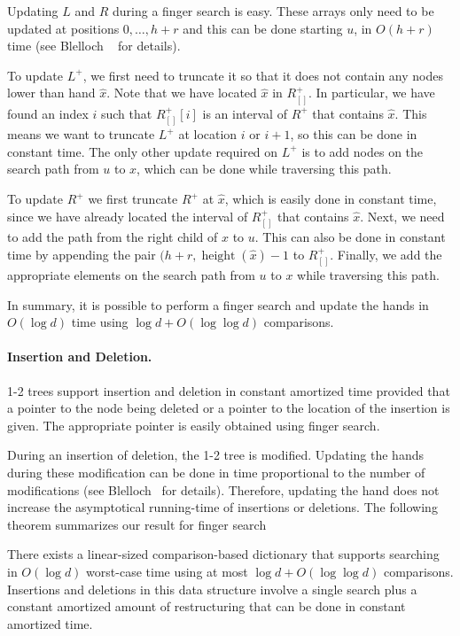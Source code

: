 \documentclass{patmorin}
\DeclareMathOperator{\hgt}{height}
\begin{document}
Updating $L$ and $R$ during a finger search is easy.  These arrays only
need to be updated at positions $0,\ldots,h+r$ and this can be done
starting $u$, in $O(h+r)$ time (see Blelloch \etal\ \cite{x} for details).

To update $L^+$, we first need to truncate it so that it does not
contain any nodes lower than hand $\hat x$.  Note that we have located
$\hat x$ in $R^+_{[]}$.  In particular, we have found an index $i$
such that $R^+_{[]}[i]$ is an interval of $R^+$ that contains $\hat x$.
This means we want to truncate $L^+$ at location $i$ or $i+1$, so this
can be done in constant time.  The only other update required on $L^+$
is to add nodes on the search path from $u$ to $x$, which can be done
while traversing this path.

To update $R^+$ we first truncate $R^+$ at $\hat x$, which is easily
done in constant time, since we have already located the interval of
$R^+_{[]}$ that contains $\hat x$. Next, we need to add the path from the
right child of $\hat x$ to $u$.  This can also be done in constant time
by appending the pair $(h+r,\hgt(\hat x)-1$ to $R^+_{[]}$.  Finally,
we add the appropriate elements on the search path from $u$ to $x$
while traversing this path.

In summary, it is possible to perform a finger search and update the
hands in $O(\log d)$ time using $\log d+O(\log\log d)$ comparisons.

\paragraph{Insertion and Deletion.} 1-2 trees support insertion and
deletion in constant amortized time provided that a pointer to the node
being deleted or a pointer to the location of the insertion is given.
The appropriate pointer is easily obtained using finger search.

During an insertion of deletion, the 1-2 tree is modified.  Updating the
hands during these modification can be done in time proportional to the
number of modifications (see Blelloch \etal\ for details).   Therefore,
updating the hand does not increase the asymptotical running-time of
insertions or deletions.  The following theorem summarizes our result
for finger search

\begin{thm}
  There exists a linear-sized comparison-based dictionary that
  supports searching in $O(\log d)$ worst-case time using at most $\log
  d+O(\log\log d)$ comparisons.  Insertions and deletions in this data
  structure involve a single search plus a constant amortized amount of
  restructuring that can be done in constant amortized time.
\end{thm}
\end{document}
